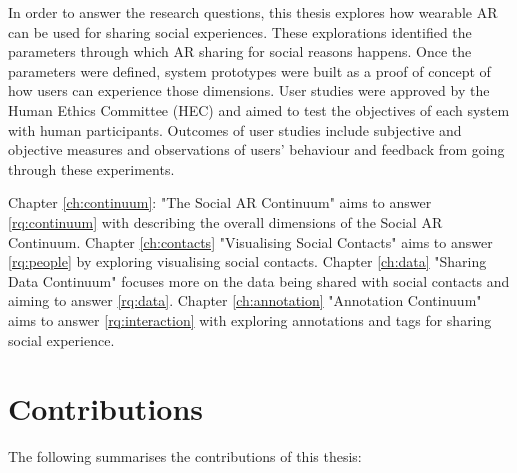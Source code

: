 In order to answer the research questions, this thesis explores how wearable AR can be used for sharing social experiences. These explorations identified the parameters through which AR sharing for social reasons happens. Once the parameters were defined, system prototypes were built as a proof of concept of how users can experience those dimensions. User studies were approved by the Human Ethics Committee (HEC) and aimed to test the objectives of each system with human participants. Outcomes of user studies include subjective and objective measures and observations of users' behaviour and feedback from going through these experiments. 

Chapter \ref{ch:continuum}: "The Social AR Continuum" aims to answer \ref{rq:continuum} with describing the overall dimensions of the Social AR Continuum. 
Chapter \ref{ch:contacts} "Visualising Social Contacts" aims to answer \ref{rq:people} by exploring visualising social contacts. 
Chapter \ref{ch:data} "Sharing Data Continuum" focuses more on the data being shared with social contacts and aiming to answer \ref{rq:data}.
Chapter \ref{ch:annotation} "Annotation Continuum" aims to answer \ref{rq:interaction} with exploring annotations and tags for sharing social experience. 

\section{Contributions}

The following summarises the contributions of this thesis: 

